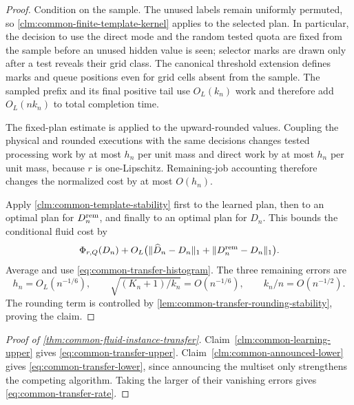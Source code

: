\begin{proof}
Condition on the sample.  The unused labels remain uniformly permuted, so
\cref{clm:common-finite-template-kernel} applies to the selected plan.
In particular, the decision to use the direct mode and the random tested
quota are fixed from the sample before an unused hidden value is seen;
selector marks are drawn only after a test reveals their grid class.  The
canonical threshold extension defines marks and queue positions even for
grid cells absent from the sample.  The sampled prefix and its final positive
tail use $O_L(k_n)$ work and therefore add $O_L(nk_n)$ to total completion
time.

The fixed-plan estimate is applied to the upward-rounded values.  Coupling
the physical and rounded executions with the same decisions changes tested
processing work by at most $h_n$ per unit mass and direct work by at most
$h_n$ per unit mass, because $r$ is one-Lipschitz.  Remaining-job accounting
therefore changes the normalized cost by at most $O(h_n)$.

Apply \cref{clm:common-template-stability} first to the learned plan, then to
an optimal plan for $D_n^{\rm rem}$, and finally to an optimal plan for
$D_n$.  This bounds the conditional fluid cost by
\[
 \Phi_{r,Q}(D_n)
 +O_L\bigl(
   \|\widehat D_n-D_n\|_1+
   \|D_n^{\rm rem}-D_n\|_1\bigr).
\]
Average and use \cref{eq:common-transfer-histogram}.  The three remaining
errors are
\[
 h_n=O_L(n^{-1/6}),\qquad
 \sqrt{(K_n+1)/k_n}=O(n^{-1/6}),\qquad
 k_n/n=O(n^{-1/2}).
\]
The rounding term is controlled by
\cref{lem:common-transfer-rounding-stability}, proving the claim.
\end{proof}

\begin{proof}[Proof of \cref{thm:common-fluid-instance-transfer}]
Claim~\ref{clm:common-learning-upper} gives
\cref{eq:common-transfer-upper}.  Claim~\ref{clm:common-announced-lower}
gives \cref{eq:common-transfer-lower}, since announcing the multiset only
strengthens the competing algorithm.  Taking the larger of their vanishing
errors gives \cref{eq:common-transfer-rate}.
\end{proof}
